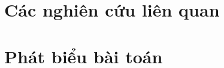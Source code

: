 \documentclass[10pt, conference, a4paper, compsocconf]{IEEEtran}
\begin{document}
\section{Các nghiên cứu liên quan}
%

\section{Phát biểu bài toán}
\label{sec:problem}
\end{document}
